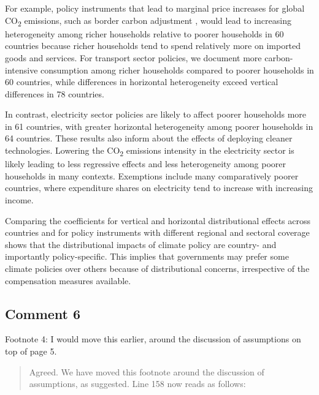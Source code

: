 \documentclass[11pt]{article}
\newenvironment{response}
{\begin{quote}\color{black}}
{\end{quote}}
\begin{document}
\begin{revisionbox}
    For example, policy instruments that lead to marginal price increases for global CO\textsubscript{2} emissions, such as border carbon adjustment \autocite[e.g.,][]{Mehling.2019,Cosbey.2019}, would lead to increasing heterogeneity among richer households relative to poorer households in 60 countries because richer households tend to spend relatively more on imported goods and services. For transport sector policies, we document more carbon-intensive consumption among richer households compared to poorer households in 60 countries, while differences in horizontal heterogeneity exceed vertical differences in 78 countries. 

    In contrast, electricity sector policies are likely to affect poorer households more in 61 countries, with greater horizontal heterogeneity among poorer households in 64 countries. These results also inform about the effects of deploying cleaner technologies. Lowering the CO\textsubscript{2} emissions intensity in the electricity sector is likely leading to less regressive effects and less heterogeneity among poorer households in many contexts. Exemptions include many comparatively poorer countries, where expenditure shares on electricity tend to increase with increasing income. 

    Comparing the coefficients for vertical and horizontal distributional effects across countries and for policy instruments with different regional and sectoral coverage shows that the distributional impacts of climate policy are country- and importantly policy-specific. This implies that governments may prefer some climate policies over others because of distributional concerns, irrespective of the compensation measures available.
\end{revisionbox}

\subsection*{Comment 6}\label{comment_R2_6}

\begin{commentbox}
    Footnote 4: I would move this earlier, around the discussion of assumptions on top of page 5.
\end{commentbox}

\begin{response}
    Agreed. We have moved this footnote around the discussion of assumptions, as suggested. Line 158 now reads as follows:
\end{response}
\end{document}
